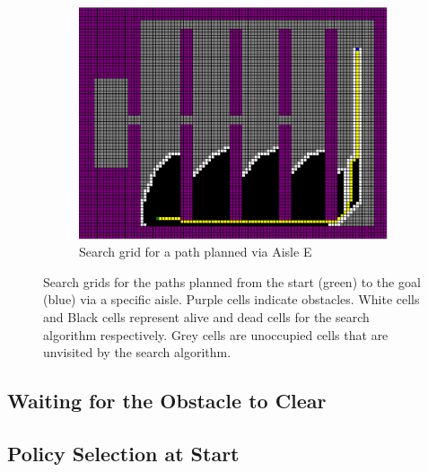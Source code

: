 \documentclass[a4paper,12pt]{article}
\begin{document}
\begin{figure}[htp]
\begin{subfigure}{.45\textwidth}
					\includegraphics[width=\textwidth]{../exports/initial_search_grid_aisleE}
					\caption{Search grid for a path planned via Aisle E}
					\label{fig:searchGridAisleE}
				\end{subfigure}
				\caption{Search grids for the paths planned from the start (green) to the goal (blue) via a specific aisle. Purple cells indicate obstacles. White cells and Black cells represent alive and dead cells for the search algorithm respectively. Grey cells are unoccupied cells that are unvisited by the search algorithm.}
				\label{fig:searchGridViaAisles}
			\end{figure}
		
		\subsection{Waiting for the Obstacle to Clear}
		
		\subsection{Policy Selection at Start}
		
	\newpage
	
	
	
	
	\newpage
	\appendix
	\appendixpage
	\addappheadtotoc
	
\end{document}
